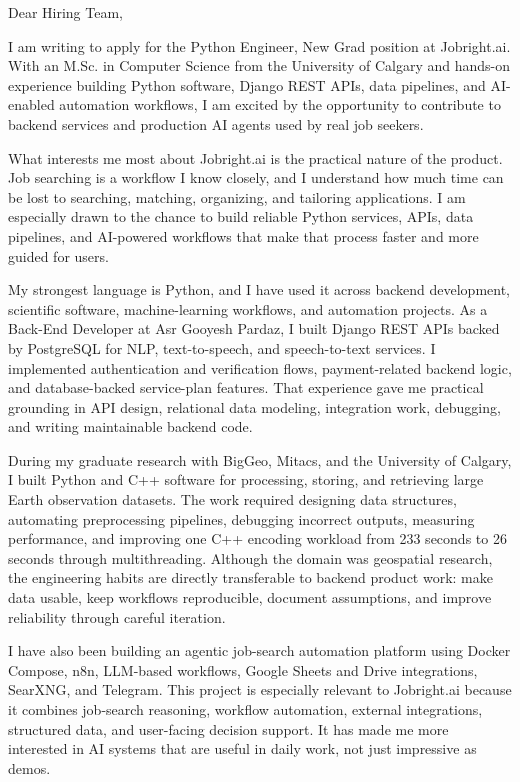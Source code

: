 \documentclass[11pt]{letter}
\begin{document}
\begin{letter}{}

\opening{Dear Hiring Team,}

I am writing to apply for the Python Engineer, New Grad position at Jobright.ai. With an M.Sc. in Computer Science from the University of Calgary and hands-on experience building Python software, Django REST APIs, data pipelines, and AI-enabled automation workflows, I am excited by the opportunity to contribute to backend services and production AI agents used by real job seekers.

What interests me most about Jobright.ai is the practical nature of the product. Job searching is a workflow I know closely, and I understand how much time can be lost to searching, matching, organizing, and tailoring applications. I am especially drawn to the chance to build reliable Python services, APIs, data pipelines, and AI-powered workflows that make that process faster and more guided for users.

My strongest language is Python, and I have used it across backend development, scientific software, machine-learning workflows, and automation projects. As a Back-End Developer at Asr Gooyesh Pardaz, I built Django REST APIs backed by PostgreSQL for NLP, text-to-speech, and speech-to-text services. I implemented authentication and verification flows, payment-related backend logic, and database-backed service-plan features. That experience gave me practical grounding in API design, relational data modeling, integration work, debugging, and writing maintainable backend code.

During my graduate research with BigGeo, Mitacs, and the University of Calgary, I built Python and C++ software for processing, storing, and retrieving large Earth observation datasets. The work required designing data structures, automating preprocessing pipelines, debugging incorrect outputs, measuring performance, and improving one C++ encoding workload from 233 seconds to 26 seconds through multithreading. Although the domain was geospatial research, the engineering habits are directly transferable to backend product work: make data usable, keep workflows reproducible, document assumptions, and improve reliability through careful iteration.

I have also been building an agentic job-search automation platform using Docker Compose, n8n, LLM-based workflows, Google Sheets and Drive integrations, SearXNG, and Telegram. This project is especially relevant to Jobright.ai because it combines job-search reasoning, workflow automation, external integrations, structured data, and user-facing decision support. It has made me more interested in AI systems that are useful in daily work, not just impressive as demos.


\end{letter}
\end{document}
